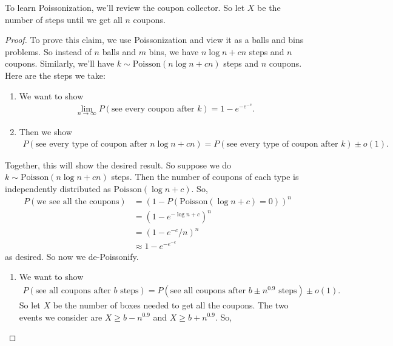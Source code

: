 \documentclass{report}
\begin{document}
To learn Poissonization, we'll review the coupon collector. So let $X$ be the number of steps until we get all $n$ coupons.
\begin{proof}
    To prove this claim, we use Poissonization and view it as a balls and bins problems. So instead of $n$ balls and $m$ bins, we have $n\log n + cn$ steps and $n$ coupons. Similarly, we'll have $k \sim \mathrm{Poisson}(n\log n + cn)$ steps and $n$ coupons. Here are the steps we take:
    \begin{enumerate}
        \item We want to show
        \begin{align*}
            \lim_{n \to \infty} P(\text{see every coupon after $k$}) = 1 - e^{-e^{-c}}.
        \end{align*}
        \item Then we show
        \begin{align*}
            P(\text{see every type of coupon after $n \log n + cn$}) = P(\text{see every type of coupon after $k$}) \pm o(1).
        \end{align*}
    \end{enumerate}
    Together, this will show the desired result. So suppose we do $k \sim \mathrm{Poisson}(n  \log n + cn)$ steps. Then the number of coupons of each type is independently distributed as $\mathrm{Poisson}(\log n + c)$. So, 
    \begin{align*}
        P(\text{we see all the coupons}) &= (1 - P(\mathrm{Poisson}(\log n + c) = 0))^n \\
        &= (1 - e^{-\log n + c})^n \\
        &= (1 - e^{-c}/n)^n \\
        &\approx 1 - e^{-e^{-c}}
    \end{align*}
    as desired.
    \newpage
    \noindent So now we de-Poissonify. 
    \begin{enumerate}[label=(\alph*)]
        \item We want to show 
        \begin{align*}
            P(\text{see all coupons after $b$ steps}) = P(\text{see all coupons after $b \pm n^{0.9}$ steps}) \pm o(1).
        \end{align*}
        So let $X$ be the number of boxes needed to get all the coupons. The two events we consider are $X \geq b - n^{0.9}$ and $X \geq b + n^{0.9}$. So,

\end{enumerate}
\end{proof}
\end{document}
